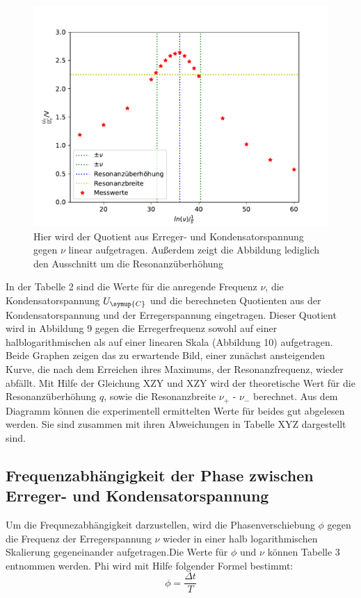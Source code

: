  \begin{figure}
  \centering
  \includegraphics[scale = 0.7]{plotC2.pdf}
  \caption{Hier wird der Quotient aus Erreger- und Kondensatorspannung gegen $\nu$ linear aufgetragen. Außerdem zeigt
  die Abbildung lediglich den Ausschnitt um die Resonanzüberhöhung}
  \label{Abb:10}
 \end{figure}

In der Tabelle 2 sind die Werte für die anregende Frequenz $\nu$, die Kondensatorspannung $U_\symup{C}$ und die berechneten
Quotienten aus der Kondensatorspannung und der Erregerspannung eingetragen. Dieser Quotient wird in Abbildung 9 gegen die
Erregerfrequenz sowohl auf einer halblogarithmischen als auf einer linearen Skala (Abbildung 10) aufgetragen.
Beide Graphen zeigen das zu erwartende Bild, einer zunächst ansteigenden Kurve, die nach dem Erreichen ihres Maximums, der
Resonanzfrequenz, wieder abfällt. Mit Hilfe der Gleichung XZY und XZY wird der theoretische Wert für die Resonanzüberhöhung
$q$, sowie die Resonanzbreite $\nu_+$ - $\nu_-$ berechnet. Aus dem Diagramm können die experimentell ermittelten Werte für beides
gut abgelesen werden. Sie sind zusammen mit ihren Abweichungen in Tabelle XYZ dargestellt sind.

\subsection{Frequenzabhängigkeit der Phase zwischen Erreger- und Kondensatorspannung}
Um die Frequnezabhängigkeit darzustellen, wird die Phasenverschiebung $\phi$ gegen die Frequenz der Erregerspannung $\nu$
wieder in einer halb logarithmischen Skalierung gegeneinander aufgetragen.Die Werte für $\phi$ und $\nu$ können Tabelle 3
entnommen werden.
Phi wird mit Hilfe folgender Formel bestimmt:
\begin{equation}
  \phi = \frac{\Delta t}{T}
\end{equation}

